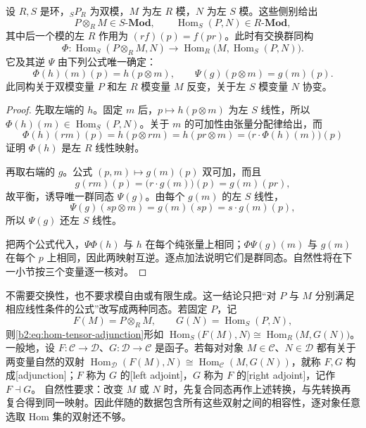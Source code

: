 \begin{theorem}\label{b2:thm:hom-tensor-adjunction}
	设 \(R,S\) 是环，\({}_SP_R\) 为双模，\(M\) 为左 \(R\) 模，\(N\) 为左 \(S\) 模。这些侧别给出
	\[
		P\otimes_RM\in S\text{-}\mathbf{Mod},\qquad \operatorname{Hom}_S(P,N)\in R\text{-}\mathbf{Mod},
	\]
	其中后一个模的左 \(R\) 作用为 \((rf)(p)=f(pr)\)。此时有交换群同构
	\begin{equation}\label{b2:eq:hom-tensor-adjunction}
		\Phi:\operatorname{Hom}_S(P\otimes_RM,N) \longrightarrow \operatorname{Hom}_R\bigl(M,\operatorname{Hom}_S(P,N)\bigr).
	\end{equation}
	它及其逆 \(\Psi\) 由下列公式唯一确定：
	\[
		\Phi(h)(m)(p)=h(p\otimes m),\qquad \Psi(g)(p\otimes m)=g(m)(p).
	\]
	此同构关于双模变量 \(P\) 和左 \(R\) 模变量 \(M\) 反变，关于左 \(S\) 模变量 \(N\) 协变。
\end{theorem}
\begin{proof}
	先取左端的 \(h\)。固定 \(m\) 后，\(p\mapsto h(p\otimes m)\) 为左 \(S\) 线性，所以 \(\Phi(h)(m)\in\operatorname{Hom}_S(P,N)\)。关于 \(m\) 的可加性由张量分配律给出，而
	\[
		\Phi(h)(rm)(p)=h(p\otimes rm)=h(pr\otimes m) =\bigl(r\cdot\Phi(h)(m)\bigr)(p)
	\]
	证明 \(\Phi(h)\) 是左 \(R\) 线性映射。

	再取右端的 \(g\)。公式 \((p,m)\mapsto g(m)(p)\) 双可加，而且
	\[
		g(rm)(p)=\bigl(r\cdot g(m)\bigr)(p)=g(m)(pr),
	\]
	故平衡，诱导唯一群同态 \(\Psi(g)\)。由每个 \(g(m)\) 的左 \(S\) 线性，
	\[
		\Psi(g)(sp\otimes m)=g(m)(sp)=s\cdot g(m)(p),
	\]
	所以 \(\Psi(g)\) 还左 \(S\) 线性。

	把两个公式代入，\(\Psi\Phi(h)\) 与 \(h\) 在每个纯张量上相同；\(\Phi\Psi(g)(m)\) 与 \(g(m)\) 在每个 \(p\) 上相同，因此两映射互逆。逐点加法说明它们是群同态。自然性将在下一小节按三个变量逐一核对。
\end{proof}

不需要交换性，也不要求模自由或有限生成。这一结论只把“对 \(P\) 与 \(M\) 分别满足相应线性条件的公式”改写成两种同态。若固定 \(P\)，记
\[
	F(M)=P\otimes_RM,\qquad G(N)=\operatorname{Hom}_S(P,N),
\]
则\eqref{b2:eq:hom-tensor-adjunction}形如 \(\operatorname{Hom}_S\bigl(F(M),N\bigr)\cong\operatorname{Hom}_R\bigl(M,G(N)\bigr)\)。一般地，设 \(F:\mathcal C\to\mathcal D\)、\(G:\mathcal D\to\mathcal C\) 是函子。若每对对象 \(M\in\mathcal C\)、\(N\in\mathcal D\) 都有关于两变量自然的双射 \(\operatorname{Hom}_{\mathcal D}(F(M),N)\cong\operatorname{Hom}_{\mathcal C}(M,G(N))\)，就称 \(F,G\) 构成[adjunction]；\(F\) 称为 \(G\) 的[left adjoint]，\(G\) 称为 \(F\) 的[right adjoint]，记作 \(F\dashv G\)。
自然性要求：改变 \(M\) 或 \(N\) 时，先复合同态再作上述转换，与先转换再复合得到同一映射。因此伴随的数据包含所有这些双射之间的相容性，逐对象任意选取 Hom 集的双射还不够。

